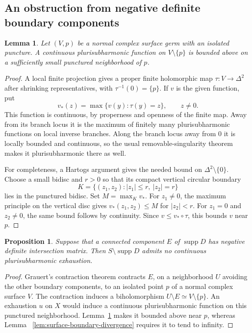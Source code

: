\documentclass[11pt]{amsart}
\newtheorem{proposition}[theorem]{Proposition}
\newtheorem{lemma}[theorem]{Lemma}
\theoremstyle{definition}
\theoremstyle{remark}
\numberwithin{equation}{section}
\newcommand{\supp}{\operatorname{supp}}
\begin{document}
\subsection{An obstruction from negative definite boundary components}

\begin{lemma}\label{lem:surface-normal-puncture-bound}
Let $(V,p)$ be a normal complex surface germ with an isolated puncture.
A continuous plurisubharmonic function on $V\setminus\{p\}$ is bounded
above on a sufficiently small punctured neighborhood of $p$.
\end{lemma}
\begin{proof}
A local finite projection gives a proper finite holomorphic map
$\tau:V\to\Delta^2$ after shrinking representatives, with
$\tau^{-1}(0)=\{p\}$.  If $v$ is the given function, put
\[
 v_*(z)=\max\{v(y):\tau(y)=z\},\qquad z\ne0.
\]
This function is continuous, by properness and openness of the finite
map.  Away from its branch locus it is the maximum of finitely many
plurisubharmonic functions on local inverse branches.  Along the branch
locus away from $0$ it is locally bounded and continuous, so the usual
removable-singularity theorem makes it plurisubharmonic there as well.

For completeness, a Hartogs argument gives the needed bound on
$\Delta^2\setminus\{0\}$.  Choose a small bidisc and $r>0$ so that its
compact vertical circular boundary
\[
 K=\{(z_1,z_2):|z_1|\le r,\ |z_2|=r\}
\]
lies in the punctured bidisc.  Set $M=\max_K v_*$.  For $z_1\ne0$, the
maximum principle on the vertical disc gives $v_*(z_1,z_2)\le M$ for
$|z_2|<r$.  For $z_1=0$ and $z_2\ne0$, the same bound follows by
continuity.  Since $v\le v_*\circ\tau$, this bounds $v$ near $p$.
\end{proof}

\begin{proposition}\label{prop:surface-negative-boundary}
Suppose that a connected component $E$ of $\supp D$ has negative
definite intersection matrix.  Then $S\setminus\supp D$ admits no
continuous plurisubharmonic exhaustion.
\end{proposition}
\begin{proof}
Grauert's contraction theorem \cite{Grauert1962} contracts $E$, on a
neighborhood $U$ avoiding the other boundary components, to an isolated
point $p$ of a normal complex surface $V$.  The contraction induces a
biholomorphism $U\setminus E\simeq V\setminus\{p\}$.  An exhaustion
$u$ on $X$ would induce a continuous plurisubharmonic function on this
punctured neighborhood.  Lemma~\ref{lem:surface-normal-puncture-bound}
makes it bounded above near $p$, whereas Lemma~
\ref{lem:surface-boundary-divergence} requires it to tend to infinity.
\end{proof}
\end{document}
